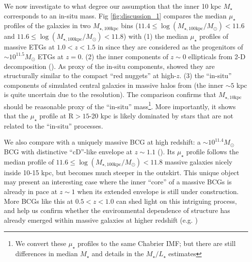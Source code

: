 \documentclass[a4paper,fleqn,usenatbib]{mnras}
\def\mstar{{$M_{\star}$}}
\def\minn{{$M_{\star,10\mathrm{kpc}}$}}
\def\mtot{{$M_{\star,100\mathrm{kpc}}$}}
\def\logmtot{{$\log (M_{\star,100\mathrm{kpc}}/M_{\odot})$}}
\def\m2l{{$M_{\star}/L_{\star}$}}
\def\mden{{$\mu_{\star}$}}
\begin{document}
    We now investigate to what degree our assumption that the inner 10 kpc \mstar{}
    corresponds to an in-situ mass.    
    Fig \ref{fig:discussion_1} compares the median \mden{} profiles of the 
    galaxies in two \mtot{} bins 
    ($11.4\leq$\logmtot{}$<11.6$ and $11.6\leq$\logmtot{}$<11.8$) with 
    (1) the median \mden{} profiles of massive ETGs at $1.0 < z < 1.5$ in
    \citealt{Patel2013} since they are considered as the progenitors of 
    ${\sim} 10^{11.5} M_{\odot}$ ETGs at $z=0$.    
    (2) the inner components of $z{\sim} 0$ ellipticals from 2-D decomposition 
    (\citealt{Huang2013a}).
    As proxy of the in-situ components, \citet{Huang2013b} showed they are 
    structurally similar to the compact ``red nuggets'' at high-$z$. 
    (3) the ``in-situ'' components of simulated central galaxies in massive halos 
    from \citet{Cooper13} (the inner ${\sim} 5$ kpc is quite uncertain due to the 
    resolution).  
    The comparison confirms that \minn{} should be reasonable proxy of the 
    ``in-situ'' mass\footnote{We convert these \mden{} profiles to the same 
    Chabrier IMF; but there are still differences in median \mstar{} and 
    details in the \m2l{} estimates}.  
    More importantly, it shows that the \mden{} profile at 
    $\mathrm{R} > 15$-20 kpc is likely dominated by stars that are not related 
    to the ``in-situ'' processes.  
    
    We also compare with a uniquely massive BCG at high redshift: 
    a ${\sim} 10^{11.4} M_{\odot}$ BCG with distinctive ``cD''-like envelope at 
    $z{\sim} 1.1$ (\citealt{Liu2013}).  
    Its \mden{} profile follows the median profile of $11.6\leq$\logmtot{}$<11.8$ 
    massive galaxies nicely inside 10-15 kpc, but becomes much steeper in the outskirt.  
    This unique object may present an interesting case where the inner ``core'' of a 
    massive BCGs is already in pace at $z{\sim} 1$ when its extended envelope is still
    under construction.
    More BCGs like this at $0.5 < z < 1.0$ can shed light on this intriguing 
    process, and help us confirm whether the environmental dependence of structure 
    has already emerged within massive galaxies at higher redshift 
    (e.g. \citealt{Papovich2012})



\end{document}
